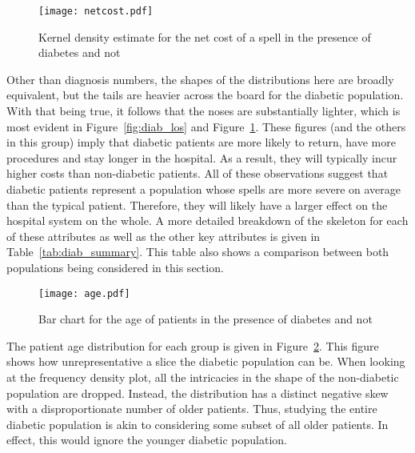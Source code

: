 \begin{figure}
    \centering
    \texttt{[image: netcost.pdf]}
    \caption{%
        Kernel density estimate for the net cost of a spell in the presence of
        diabetes and not
    }\label{fig:diab_netcost}
\end{figure}

Other than diagnosis numbers, the shapes of the distributions here are broadly
equivalent, but the tails are heavier across the board for the diabetic
population. With that being true, it follows that the noses are substantially
lighter, which is most evident in Figure~\ref{fig:diab_los} and
Figure~\ref{fig:diab_netcost}. These figures (and the others in this group)
imply that diabetic patients are more likely to return, have more procedures and
stay longer in the hospital. As a result, they will typically incur higher costs
than non-diabetic patients. All of these observations suggest that diabetic
patients represent a population whose spells are more severe on average than the
typical patient. Therefore, they will likely have a larger effect on the
hospital system on the whole. A more detailed breakdown of the skeleton for each
of these attributes as well as the other key attributes is given in
Table~\ref{tab:diab_summary}. This table also shows a comparison between both
populations being considered in this section.

\begin{sidewaystable}
    \centering
        \resizebox{.8\paperheight}{!}{%
            
        }
    \caption{%
        Spell-level statistics for each of the key attributes in the diabetic
        population (and non-diabetic population in parentheses)
    }\label{tab:diab_summary}
\end{sidewaystable}

\begin{figure}
    \centering
    \texttt{[image: age.pdf]}
    \caption{%
        Bar chart for the age of patients in the presence of diabetes and not
    }\label{fig:diab_age}
\end{figure}

The patient age distribution for each group is given in
Figure~\ref{fig:diab_age}. This figure shows how unrepresentative a slice the
diabetic population can be. When looking at the frequency density plot, all the
intricacies in the shape of the non-diabetic population are dropped. Instead,
the distribution has a distinct negative skew with a disproportionate number of
older patients. Thus, studying the entire diabetic population is akin to
considering some subset of all older patients. In effect, this would ignore the
younger diabetic population.

